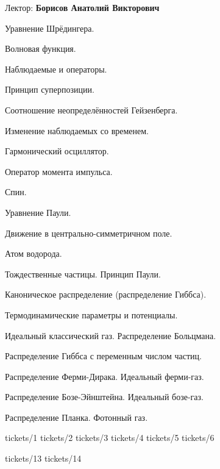 \documentclass[specialist, subf, href, colorlinks=true, 12pt, times, mtpro, final]{disser}
\begin{document}
\tableofcontents

\newpage
{}
\noindent Лектор: {\bf Борисов Анатолий Викторович}\\

\begin{enumerate}
{\footnotesize
\item Уравнение Шрёдингера.
\item Волновая функция.
\item Наблюдаемые и операторы.
\item Принцип суперпозиции.
\item Соотношение неопределённостей Гейзенберга.
\item Изменение наблюдаемых со временем.
\item Гармонический осциллятор.
\item Оператор момента импульса.
\item Спин.
\item Уравнение Паули.
\item Движение в центрально-симметричном поле.
\item Атом водорода.
\item Тождественные частицы. Принцип Паули.
\item Каноническое распределение (распределение Гиббса).
\item Термодинамические параметры и потенциалы.
\item Идеальный классический газ. Распределение Больцмана. 
\item Распределение Гиббса с переменным числом частиц. 
\item Распределение Ферми-Дирака. Идеальный ферми-газ.
\item Распределение Бозе-Эйнштейна. Идеальный бозе-газ.
\item Распределение Планка. Фотонный газ.
}
\end{enumerate}

 {tickets/1}
 {tickets/2}
 {tickets/3}
 {tickets/4}
 {tickets/5}
 {tickets/6}

 {tickets/13}
 {tickets/14}
 
\end{document}
